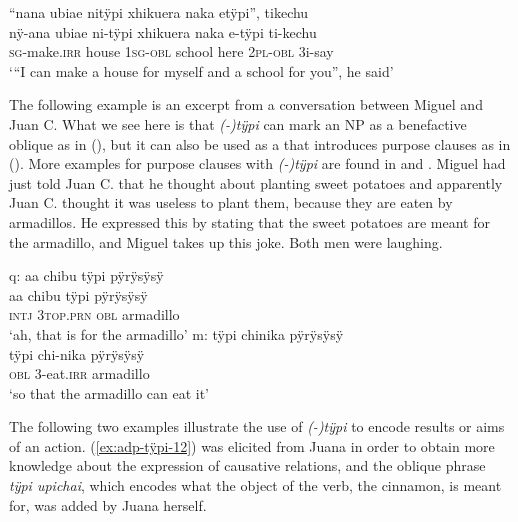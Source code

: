 \ea\label{ex:adp-tÿpi-11}
\begingl
\glpreamble “nana ubiae nitÿpi xhikuera naka etÿpi”, tikechu\\
\gla nÿ-ana ubiae ni-tÿpi xhikuera naka e-tÿpi ti-kechu\\
\textsc{sg}-make.\textsc{irr} house 1\textsc{sg}-\textsc{obl} school here 2\textsc{pl}-\textsc{obl} 3i-say\\
\glft ‘“I can make a house for myself and a school for you”, he said’
\endgl
\trailingcitation{[mxx-p110825l.110-111]}
\xe

The following example is an excerpt from a conversation between Miguel and Juan C. What we see here is that \textit{(-)tÿpi} can mark an NP as a benefactive oblique as in (), but it can also be used as a  that introduces purpose  clauses as in (). More examples for purpose clauses with \textit{(-)tÿpi} are found in  and .
 Miguel had just told Juan C. that he thought about planting sweet potatoes and apparently Juan C. thought it was useless to plant them, because they are eaten by armadillos. He expressed this by stating that the sweet potatoes are meant for the armadillo, and Miguel takes up this joke. Both men were laughing.

\ea\label{ex:adp-tÿpi-1}
  \ea\label{ex:adp-tÿpi-1.1}
\begingl
\glpreamble \textup{q:} aa chibu tÿpi pÿrÿsÿsÿ\\
\gla aa chibu tÿpi pÿrÿsÿsÿ\\
\glb \textsc{intj} 3\textsc{top.prn} \textsc{obl} armadillo\\
\glft ‘ah, that is for the armadillo’
\endgl
  \ex\label{ex:adp-tÿpi-1.2}
\begingl
\glpreamble \textup{m:} tÿpi chinika pÿrÿsÿsÿ\\
\gla tÿpi chi-nika pÿrÿsÿsÿ\\
\glb \textsc{obl} 3-eat.\textsc{irr} armadillo\\
\glft ‘so that the armadillo can eat it’
\endgl
\trailingcitation{[mqx-p110826l.578-580]}
\z
\xe
{}

\largerpage[-2]
The following two examples illustrate the use of \textit{(-)tÿpi} to encode results or aims of an action. (\ref{ex:adp-tÿpi-12}) was elicited from Juana in order to obtain more knowledge about the expression of causative relations, and the oblique phrase \textit{tÿpi upichai}, which encodes what the object of the verb, the cinnamon, is meant for, was added by Juana herself.

